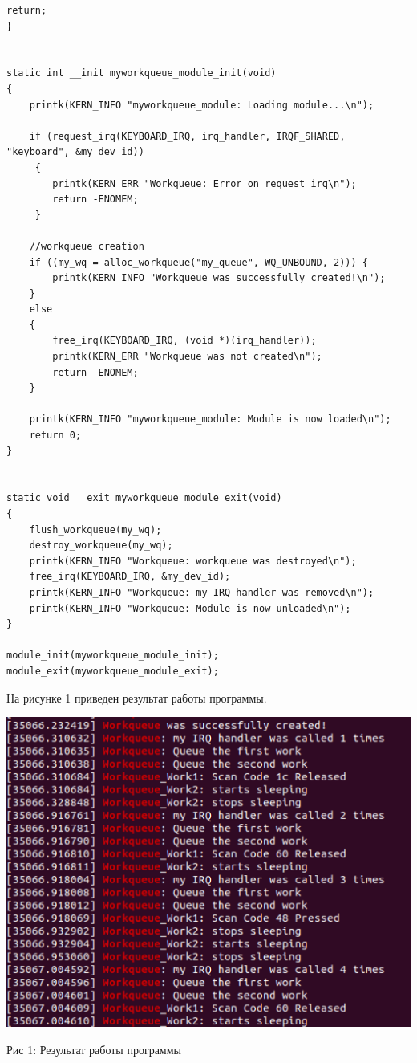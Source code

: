 \documentclass[12pt]{report}
\begin{document}
\begin{lstlisting}[label=some-code,caption=Код программы my\_workqueue.c]
	return;
}


static int __init myworkqueue_module_init(void)
{
	printk(KERN_INFO "myworkqueue_module: Loading module...\n");

	if (request_irq(KEYBOARD_IRQ, irq_handler, IRQF_SHARED, "keyboard", &my_dev_id))
   	 {
        printk(KERN_ERR "Workqueue: Error on request_irq\n");
        return -ENOMEM;
   	 }

	//workqueue creation
	if ((my_wq = alloc_workqueue("my_queue", WQ_UNBOUND, 2))) {
		printk(KERN_INFO "Workqueue was successfully created!\n");
	}
	else
	{
		free_irq(KEYBOARD_IRQ, (void *)(irq_handler));
		printk(KERN_ERR "Workqueue was not created\n");
		return -ENOMEM;
	}

	printk(KERN_INFO "myworkqueue_module: Module is now loaded\n");
    return 0;
}


static void __exit myworkqueue_module_exit(void) 
{
    flush_workqueue(my_wq);
    destroy_workqueue(my_wq);
    printk(KERN_INFO "Workqueue: workqueue was destroyed\n");
    free_irq(KEYBOARD_IRQ, &my_dev_id);
    printk(KERN_INFO "Workqueue: my IRQ handler was removed\n");
    printk(KERN_INFO "Workqueue: Module is now unloaded\n");
}

module_init(myworkqueue_module_init);
module_exit(myworkqueue_module_exit); 
\end{lstlisting}

На рисунке 1 приведен результат работы программы.
\begin{center}
		\includegraphics[scale=0.5]{pics/Res.png}
		
			Рис 1:  Результат работы программы 
\end{center}
\end{document}
